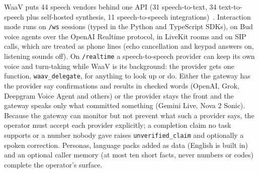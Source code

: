 WaaV puts 44 speech vendors behind one API (31 speech-to-text, 34 text-to-speech plus self-hosted synthesis, 11
speech-to-speech integrations)~\citep{waav_repo}. Interaction mode runs on \texttt{/ws} sessions (typed in the Python and
TypeScript SDKs), on Bud voice agents over the OpenAI Realtime protocol, in LiveKit rooms and on SIP calls, which are
treated as phone lines (echo cancellation and keypad answers on, listening sounds off). On \texttt{/realtime} a
speech-to-speech provider can keep its own voice and turn-taking while WaaV is its background: the provider gets one
function, \texttt{waav\_delegate}, for anything to look up or do. Either the gateway has the provider say confirmations and
results in checked words (OpenAI, Grok, Deepgram Voice Agent and others) or the provider stays the front and the gateway
speaks only what committed something (Gemini Live, Nova 2 Sonic). Because the gateway can monitor but not prevent what such
a provider says, the operator must accept each provider explicitly; a completion claim no task supports or a number nobody
gave raises \texttt{unverified\_claim} and optionally a spoken correction. Personas, language packs added as data (English is
built in) and an optional caller memory (at most ten short facts, never numbers or codes) complete the operator's surface.
